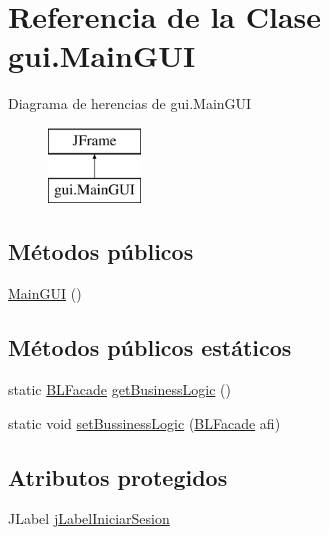 \hypertarget{classgui_1_1MainGUI}{}\section{Referencia de la Clase gui.\+Main\+G\+UI}
\label{classgui_1_1MainGUI}
Diagrama de herencias de gui.\+Main\+G\+UI\begin{figure}[H]
\begin{center}
\leavevmode
\includegraphics[height=2.000000cm]{classgui_1_1MainGUI}
\end{center}
\end{figure}
\subsection*{Métodos públicos}
\begin{DoxyCompactItemize}
\item 
\mbox{\hyperlink{classgui_1_1MainGUI_a6968ef45452fe10bd544a46d6e099c32}{Main\+G\+UI}} ()
\end{DoxyCompactItemize}
\subsection*{Métodos públicos estáticos}
\begin{DoxyCompactItemize}
\item 
static \mbox{\hyperlink{interfacebusinessLogic_1_1BLFacade}{B\+L\+Facade}} \mbox{\hyperlink{classgui_1_1MainGUI_a6bf91459a9057be4e59d27595cc65c79}{get\+Business\+Logic}} ()
\item 
static void \mbox{\hyperlink{classgui_1_1MainGUI_af7625125ee61bf5c18af79c7f356a346}{set\+Bussiness\+Logic}} (\mbox{\hyperlink{interfacebusinessLogic_1_1BLFacade}{B\+L\+Facade}} afi)
\end{DoxyCompactItemize}
\subsection*{Atributos protegidos}
\begin{DoxyCompactItemize}
\item 
J\+Label \mbox{\hyperlink{classgui_1_1MainGUI_a8e1428e62a631616aefdafe08773cb96}{j\+Label\+Iniciar\+Sesion}}
\end{DoxyCompactItemize}
